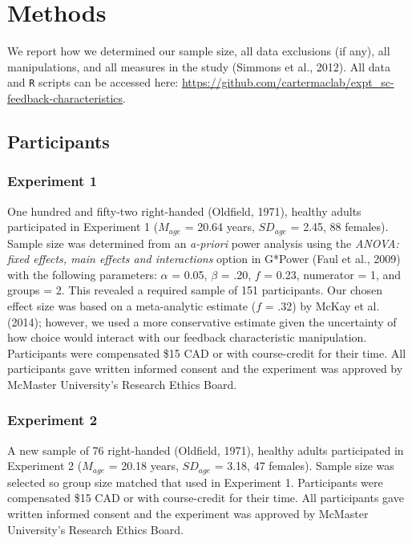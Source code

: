 \documentclass[
  man, donotrepeattitle,floatsintext]{apa7}
\begin{document}
\hypertarget{methods}{%
\section{Methods}\label{methods}}

We report how we determined our sample size, all data exclusions (if any), all manipulations, and all measures in the study (Simmons et al., 2012). All data and \texttt{R} scripts can be accessed here: \url{https://github.com/cartermaclab/expt_sc-feedback-characteristics}.

\hypertarget{participants}{%
\subsection{Participants}\label{participants}}

\hypertarget{experiment-1}{%
\subsubsection{Experiment 1}\label{experiment-1}}

One hundred and fifty-two right-handed (Oldfield, 1971), healthy adults participated in Experiment 1 (\(M_{age}\) = 20.64 years, \(SD_{age}\) = 2.45, 88 females). Sample size was determined from an \emph{a-priori} power analysis using the \emph{ANOVA: fixed effects, main effects and interactions} option in G*Power (Faul et al., 2009) with the following parameters: \(\alpha\) = 0.05, \(\beta\) = .20, \(f\) = 0.23, numerator = 1, and groups = 2. This revealed a required sample of 151 participants. Our chosen effect size was based on a meta-analytic estimate (\(f\) = .32) by McKay et al. (2014); however, we used a more conservative estimate given the uncertainty of how choice would interact with our feedback characteristic manipulation. Participants were compensated \$15 CAD or with course-credit for their time. All participants gave written informed consent and the experiment was approved by McMaster University's Research Ethics Board.

\hypertarget{experiment-2}{%
\subsubsection{Experiment 2}\label{experiment-2}}

A new sample of 76 right-handed (Oldfield, 1971), healthy adults participated in Experiment 2 (\(M_{age}\) = 20.18 years, \(SD_{age}\) = 3.18, 47 females). Sample size was selected so group size matched that used in Experiment 1. Participants were compensated \$15 CAD or with course-credit for their time. All participants gave written informed consent and the experiment was approved by McMaster University's Research Ethics Board.
\end{document}
